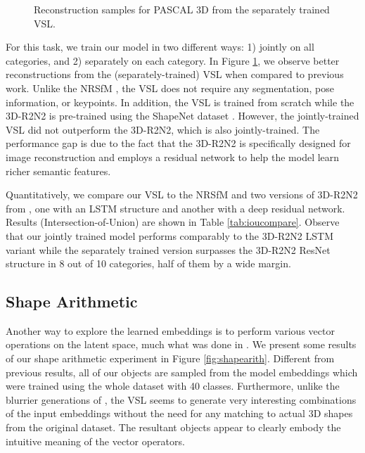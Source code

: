 \documentclass[10pt,twocolumn,letterpaper]{article}
\begin{document}
\begin{figure}[ht!]
\begin{tabular}{ccccc}
    \end{tabular}\caption{Reconstruction samples for PASCAL 3D from the separately trained VSL.}
  \label{fig:imrec}
  \vspace{-1em}
\end{figure}

For this task, we train our model in two different ways: 1) jointly on all categories, and 2) separately on each category. In Figure \ref{fig:imrec}, we observe better reconstructions from the (separately-trained) VSL when compared to previous work. Unlike the NRSfM \cite{kar2015category}, the VSL does not require any segmentation, pose information, or keypoints. In addition, the VSL is trained from scratch while the 3D-R2N2 is pre-trained using the ShapeNet dataset \cite{chang2015shapenet}. However, the jointly-trained VSL did not outperform the 3D-R2N2, which is also jointly-trained. The performance gap is due to the fact that the 3D-R2N2 is specifically designed for image reconstruction and employs a residual network \cite{he2016deep} to help the model learn richer semantic features.

Quantitatively, we compare our VSL to the NRSfM \cite{kar2015category} and two versions of 3D-R2N2 from \cite{choy20163d}, one with an LSTM structure and another with a deep residual network. Results (Intersection-of-Union) are shown in Table \ref{tab:ioucompare}. Observe that our jointly trained model performs comparably to the 3D-R2N2 LSTM variant while the separately trained version surpasses the 3D-R2N2 ResNet structure in 8 out of 10 categories, half of them by a wide margin.

\subsection{Shape Arithmetic}
\label{subsec:shapeplus}
Another way to explore the learned embeddings is to perform various vector operations on the latent space, much what was done in \cite{wu2016learning,girdhar2016learning}. We present some results of our shape arithmetic experiment in Figure \ref{fig:shapearith}. Different from previous results, all of our objects are sampled from the model embeddings which were trained using the whole dataset with 40 classes. Furthermore, unlike the blurrier generations of \cite{girdhar2016learning}, the VSL seems to generate very interesting combinations of the input embeddings without the need for any matching to actual 3D shapes from the original dataset. The resultant objects appear to clearly embody the intuitive meaning of the vector operators.
\end{document}
